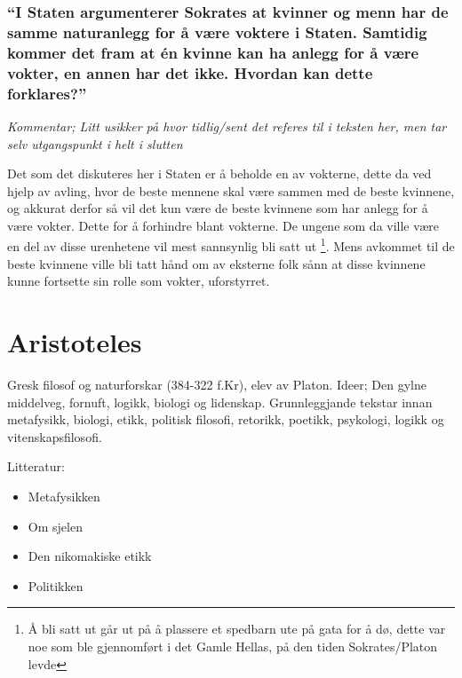 \documentclass[a4paper]{IEEEtran}
\begin{document}
        \subsubsection{``I Staten argumenterer Sokrates at kvinner og menn har de samme 
        naturanlegg for å være voktere i Staten. Samtidig kommer det fram at én 
        kvinne kan ha anlegg for å være vokter, en annen har det ikke. Hvordan 
        kan dette forklares?''}
        \textit{Kommentar; Litt usikker på hvor tidlig/sent det referes til i teksten her,
        men tar selv utgangspunkt i helt i slutten}

        Det som det diskuteres her i Staten er å beholde en  av 
        vokterne, dette da ved hjelp av avling, hvor de beste mennene skal være 
        sammen med de beste kvinnene, og akkurat derfor så vil det kun være 
        de beste kvinnene som har anlegg for å være vokter. Dette for å forhindre
         blant vokterne. De ungene som da ville være en 
        del av disse urenhetene vil mest sannsynlig bli satt ut 
        \footnote{Å bli satt ut går ut på å plassere et spedbarn ute på gata for å dø,
        dette var noe som ble gjennomført i det Gamle Hellas, på den tiden 
        Sokrates/Platon levde}. Mens avkommet til de beste kvinnene ville bli 
        tatt hånd om av eksterne folk sånn at disse kvinnene kunne fortsette 
        sin rolle som vokter, uforstyrret. \medskip  



\section{Aristoteles}
\label{aristoteles}\bigskip

Gresk filosof og naturforskar (384-322 f.Kr), elev av Platon. Ideer; Den gylne middelveg, fornuft, logikk, biologi og lidenskap. Grunnleggjande tekstar innan metafysikk, biologi, etikk, politisk filosofi, retorikk, poetikk, psykologi, logikk og vitenskapsfilosofi.
\bigskip

Litteratur:
\begin{itemize}
    \item Metafysikken
    \item Om sjelen
    \item Den nikomakiske etikk
    \item Politikken
\end{itemize}\bigskip 
\end{document}
